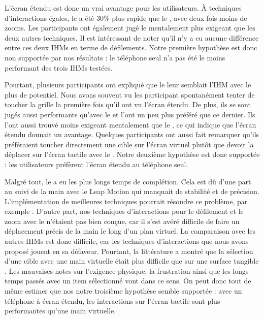 
L'écran étendu est donc un vrai avantage pour les utilisateurs. À techniques d'interactions égales, le  a été 30\% plus rapide que le , avec deux fois moins de zooms. Les participants ont également jugé le  mentalement plus exigeant que les deux autres techniques. Il est intéressant de noter qu'il n'y a eu aucune différence entre ces deux IHMs en terme de défilements. Notre première hypothèse est donc non supportée par nos résultats : le téléphone seul n'a pas été le moins performant des trois IHMs testées.

Pourtant, plusieurs participants ont expliqué que le  leur semblait l'IHM avec le plus de potentiel. Nous avons souvent vu les participant spontanément tenter de toucher la grille la première fois qu'il ont vu l'écran étendu. De plus, ils se sont jugés aussi performants qu'avec le  et l'ont un peu plus préféré que ce dernier. Ils l'ont aussi trouvé moins exigeant mentalement que le , ce qui indique que l'écran étendu donnait un avantage. Quelques participants ont aussi fait remarquer qu'ils préféraient toucher directement une cible sur l'écran virtuel plutôt que devoir la déplacer sur l'écran tactile avec le . Notre deuxième hypothèse est donc supportée : les utilisateurs préfèrent l'écran étendu au téléphone seul.

Malgré tout, le  a eu les plus longs temps de complétion. Cela est dû d'une part au suivi de la main avec le Leap Motion qui manquait de stabilité et de précision. L'implémentation de meilleures techniques pourrait résoudre ce problème, par exemple \cite{Taylor2016}. D'autre part, nos techniques d'interactions pour le défilement et le zoom avec le  n'étaient pas bien conçue, car il s'est avéré difficile de faire un déplacement précis de la main le long d'un plan virtuel. La comparaison avec les autres IHMs est donc difficile, car les techniques d'interactions que nous avons proposé jouent en sa défaveur. Pourtant, la littérature a montré que la sélection d'une cible avec une main virtuelle était plus difficile que sur une surface tangible \citep{Chan2010, Jones2012, Argelaguet2013}. Les mauvaises notes sur l'exigence physique, la frustration ainsi que les longs temps passés avec un item sélectionné vont dans ce sens. On peut donc tout de même estimer que nos notre troisième hypothèse semble supportée : avec un téléphone à écran étendu, les interactions sur l'écran tactile sont plus performantes qu'une main virtuelle.

